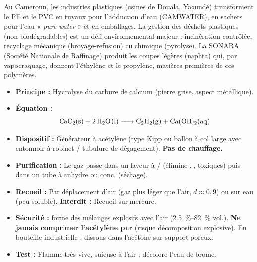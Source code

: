 \documentclass[11pt]{article}
\begin{document}
\begin{savaistu}
Au Cameroun, les industries plastiques (usines de Douala, Yaoundé) transforment le PE et le PVC en tuyaux pour l'adduction d'eau (CAMWATER), en sachets pour l'eau « \textit{pure water} » et en emballages. La gestion des déchets plastiques (non biodégradables) est un défi environnemental majeur : incinération contrôlée, recyclage mécanique (broyage-refusion) ou chimique (pyrolyse). La SONARA (Société Nationale de Raffinage) produit les coupes légères (naphta) qui, par vapocraquage, donnent l'éthylène et le propylène, matières premières de ces polymères.
\end{savaistu}

\begin{experience}
\begin{itemize}
  \item \textbf{Principe :} Hydrolyse du carbure de calcium  (pierre grise, aspect métallique).
  \item \textbf{Équation :} \[ \ce{CaC2(s) + 2 H2O(l) -> C2H2(g) + Ca(OH)2(aq)} \]
  \item \textbf{Dispositif :} Générateur à acétylène (type Kipp ou ballon à col large avec entonnoir à robinet / tubulure de dégagement). \textbf{Pas de chauffage.}
  \item \textbf{Purification :} Le gaz passe dans un laveur à / (élimine , ,  toxiques) puis dans un tube à  anhydre ou  conc. (séchage).
  \item \textbf{Recueil :} Par déplacement d'air (gaz plus léger que l'air, $d \approx 0,9$) ou sur eau (peu soluble). \textbf{Interdit :} Recueil sur mercure.
  \item \textbf{Sécurité :}  forme des mélanges explosifs avec l'air (\SIrange{2,5}{82}{\%} vol.). \textbf{Ne jamais comprimer l'acétylène pur} (risque décomposition explosive). En bouteille industrielle : dissous dans l'acétone sur support poreux.
  \item \textbf{Test :} Flamme très vive, suieuse à l'air ; décolore l'eau de brome.
\end{itemize}
\end{experience}
\end{document}
